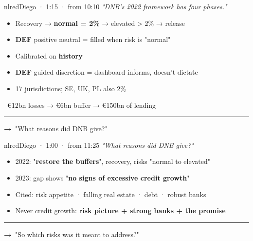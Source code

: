 \documentclass[10pt]{article}
\begin{document}
\begin{card}{nlred}{\hfill{\normalsize\mdseries Diego · 1:15 · from 10:10}}
{\large\itshape "DNB's 2022 framework has four phases."}\par\smallskip
\begin{itemize}[label=\textcolor{nlred}{\textbullet}]\item Recovery → \textbf{normal = 2\%} → elevated > 2\% → release\item \textcolor{gold!80!black}{\textbf{DEF}} positive neutral = filled when risk is "normal"\item Calibrated on \textbf{history}\item \textcolor{gold!80!black}{\textbf{DEF}} guided discretion = dashboard informs, doesn't dictate\item 17 jurisdictions; SE, UK, PL also 2\%\end{itemize}
\smallskip{\color{nlred}\textbf{\#}}\ €12bn losses → €6bn buffer → €150bn of lending\par
\vfill\textcolor{grey}{\rule{\linewidth}{0.3pt}}\par{\bfseries\color{nlred}→}\ "What reasons did DNB give?"
\end{card}
\hfill
\begin{card}{nlred}{\hfill{\normalsize\mdseries Diego · 1:00 · from 11:25}}
{\large\itshape "What reasons did DNB give?"}\par\smallskip
\begin{itemize}[label=\textcolor{nlred}{\textbullet}]\item 2022: "\textbf{restore the buffers}", recovery, risks "normal to elevated"\item 2023: gap shows "\textbf{no signs of excessive credit growth}"\item Cited: risk appetite · falling real estate · debt · robust banks\item Never credit growth: \textbf{risk picture + strong banks + the promise}\end{itemize}
\vfill\textcolor{grey}{\rule{\linewidth}{0.3pt}}\par{\bfseries\color{nlred}→}\ "So which risks was it meant to address?"
\end{card}

\newpage
\end{document}
